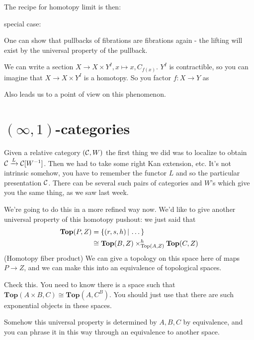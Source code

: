 \documentclass[class=report, crop=false,a4paper,twoside]{standalone}
\begin{document}
The recipe for homotopy limit is then:

special case:
\begin{center}
\end{center}
One can show that pullbacks of fibrations are fibrations again - the lifting will exist by the universal property of the pullback. 

We can write a section $X \to X \times Y^I, x \mapsto x,C_{f(x)}$. $Y^I$ is contractible, so you can imagine that $X \to X \times Y^I$ is a homotopy. So you factor $f: X \to Y$ as
\begin{center}
\end{center}
Also leads us to a point of view on this phenomenon.

\section{$(\infty, 1)$-categories}
Given a relative category $(\mathcal{C},W)$ the first thing we did was to localize to obtain $\mathcal{C} \xrightarrow{L} \mathcal{C}[W^{-1}]$. Then we had to take some right Kan extension, etc. It's not intrinsic somehow, you have to remember the functor $L$ and so the particular presentation $\mathcal{C}$. There can be several such pairs of categories and $W$'s which give you the same thing, as we saw last week. 

We're going to do this in a more refined way now. We'd like to give another universal property of this homotopy pushout: we just said that 
\begin{align*}
\mathbf{Top}(P,Z) &= \{(r,s,h)\,|\,\dots\}\\
&\cong \mathbf{Top}(B,Z) \times^h_{\operatorname{Top}(A,Z)} \mathbf{Top}(C,Z)
\end{align*}
(Homotopy fiber product) We can give a topology on this space here of maps $P \to Z$, and we can make this into an equivalence of topological spaces.

\begin{exercise}
 	Check this. You need to know there is a space such that $\mathbf{Top}(A \times B,C) \cong \mathbf{Top}(A,C^B)$. You should just use that there are such exponential objects in these spaces.
 \end{exercise} 
Somehow this universal property is determined by $A,B,C$ by equivalence, and you can phrase it in this way through an equivalence to another space. 
\end{document}
